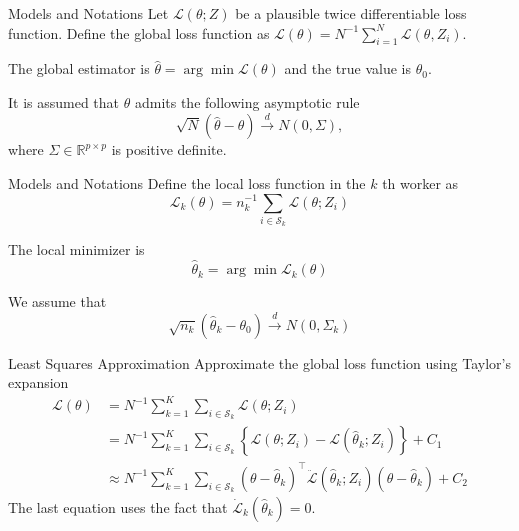 \documentclass[11pt]{beamer}
\begin{document}
\begin{frame}{Models and Notations}
Let $ \mathcal{L}(\theta ; Z)$ be a plausible twice differentiable loss function. Define the global loss function as $\mathcal{L}(\theta)=N^{-1}\sum_{i=1}^N \mathcal{L}(\theta,Z_i)$.
\vspace{3ex}

The global estimator is $\hat{\theta}=\arg\min \mathcal{L}({\theta})$ and the true value is $\theta_0$.

\vspace{3ex}
It is assumed that $\hat{\theta}$ admits the following asymptotic rule
$$
\sqrt{N}(\hat{\theta}-\theta)\stackrel{d}{\to} N(0,\Sigma),
$$
where $\Sigma \in \mathbb{R}^{p\times p}$ is positive definite.
\end{frame}

\begin{frame}{Models and Notations}
Define the local loss function in the $k$ th worker as 
$$
\mathcal{L}_k(\theta)=n_k^{-1}\sum_{i\in \mathcal{S}_k}\mathcal{L}(\theta;Z_i)
$$
\vspace{3ex}

The local minimizer is 
$$\hat{\theta}_k=\arg \min \mathcal{L}_k(\theta)
$$
\vspace{3ex}

We assume that
$$
\sqrt{n_k}(\hat{\theta}_k-\theta_0)\stackrel{d}{\to} N(0,\Sigma_k)
$$
\end{frame}

\begin{frame}{Least Squares Approximation}
Approximate the global loss function using Taylor's expansion
$$
\begin{aligned}
\mathcal{L}(\theta) &=N^{-1} \sum_{k=1}^{K} \sum_{i \in \mathcal{S}_{k}} \mathcal{L}\left(\theta ; Z_{i}\right)\\
&=N^{-1} \sum_{k=1}^{K} \sum_{i \in \mathcal{S}_{k}}\left\{\mathcal{L}\left(\theta ; Z_{i}\right)-\mathcal{L}\left(\widehat{\theta}_{k} ; Z_{i}\right)\right\}+C_{1} \\
& \approx N^{-1} \sum_{k=1}^{K} \sum_{i \in \mathcal{S}_{k}}\left(\theta-\widehat{\theta}_{k}\right)^{\top} \ddot{\mathcal{L}}\left(\widehat{\theta}_{k} ; Z_{i}\right)\left(\theta-\widehat{\theta}_{k}\right)+C_{2}
\end{aligned}
$$
The last equation uses the fact that $\dot{\mathcal{L}}_k(\hat{\theta}_k)=0$.
\end{frame}
\end{document}
